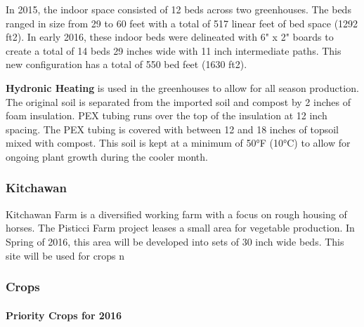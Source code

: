 In 2015, the indoor space consisted of 12 beds across two greenhouses.
The beds ranged in size from 29 to 60 feet with a total of 517 linear
feet of bed space (1292 ft2). In early 2016, these indoor beds were
delineated with 6" x 2" boards to create a total of 14 beds 29 inches
wide with 11 inch intermediate paths. This new configuration has a total
of 550 bed feet (1630 ft2).

\textbf{Hydronic Heating} is used in the greenhouses to allow for all
season production. The original soil is separated from the imported soil
and compost by 2 inches of foam insulation. PEX tubing runs over the top
of the insulation at 12 inch spacing. The PEX tubing is covered with
between 12 and 18 inches of topsoil mixed with compost. This soil is
kept at a minimum of 50°F (10°C) to allow for ongoing plant growth
during the cooler month.

\subsubsection{Kitchawan}\label{kitchawan}

Kitchawan Farm is a diversified working farm with a focus on rough
housing of horses. The Pisticci Farm project leases a small area for
vegetable production. In Spring of 2016, this area will be developed
into sets of 30 inch wide beds. This site will be used for crops n

\subsubsection{Crops}\label{crops}

\paragraph{Priority Crops for 2016}\label{priority-crops-for-2016}

